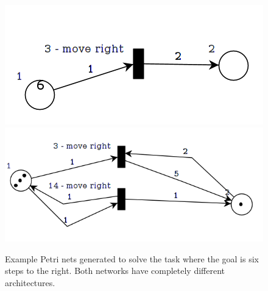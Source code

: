 \documentclass[12pt,a4paper,twocolumn]{article}
\begin{document}
\begin{figure} [h]
\centering
\includegraphics[scale=0.3, trim = 0 5mm 0 20mm, clip = true]{PetriNet_1_3}
\includegraphics[scale=0.3, trim = 0 5mm 0 10mm, clip = true]{PetriNet_1_4}
\caption{Example Petri nets generated to solve the task where the goal is six steps to the right. Both networks have completely different architectures.}
\label{fig:pn1_2}
\end{figure}
\end{document}
